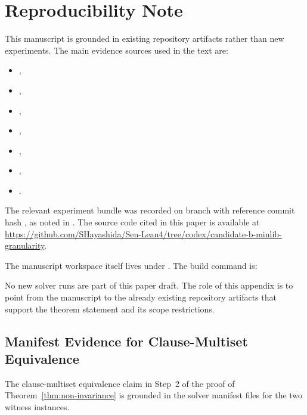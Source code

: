 \section{Reproducibility Note}
\label{sec:repro}

This manuscript is grounded in existing repository artifacts rather than new experiments.
The main evidence sources used in the text are:

\begin{itemize}[leftmargin=1.5em]
\item {},
\item {},
\item {},
\item {},
\item {},
\item {},
\item {}.
\end{itemize}

The relevant experiment bundle was recorded on branch
with reference commit hash
,
as noted in .
The source code cited in this paper is available at
\url{https://github.com/SHayashida/Sen-Lean4/tree/codex/candidate-b-minlib-granularity}.

The manuscript workspace itself lives under .
The build command is:

\begin{quote}
\end{quote}

No new solver runs are part of this paper draft.
The role of this appendix is to point from the manuscript to the already existing repository artifacts that support the theorem statement and its scope restrictions.

\subsection{Manifest Evidence for Clause-Multiset Equivalence}
\label{sec:manifest-evidence}

The clause-multiset equivalence claim in Step~2 of the proof of Theorem~\ref{thm:non-invariance} is grounded in the solver manifest files for the two witness instances.

